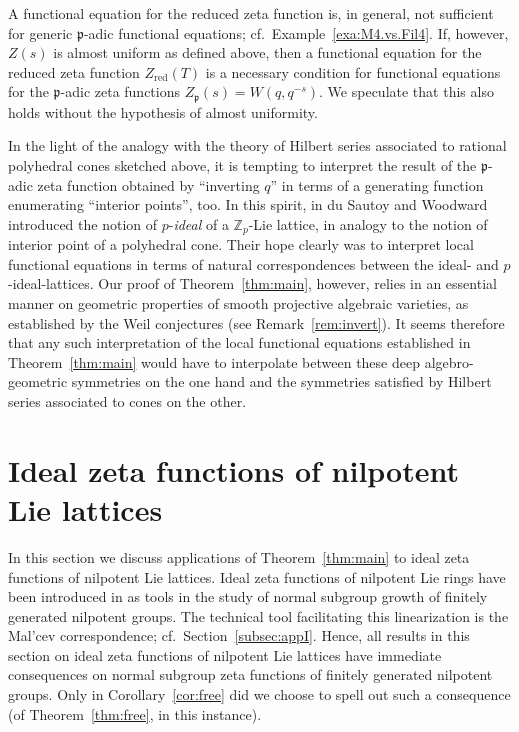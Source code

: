 \documentclass[11pt]{amsart}
\numberwithin{equation}{section}
\numberwithin{figure}{section}
\theoremstyle{plain}
\theoremstyle{definition}
\theoremstyle{remark}
\begin{document}
A functional equation for the reduced zeta function is, in general,
not sufficient for generic ${\mathfrak{p}}$-adic functional equations;
cf.\ Example~\ref{exa:M4.vs.Fil4}. If, however, $Z(s)$ is almost
uniform as defined above, then a functional equation for the reduced
zeta function $Z_\operatorname{red}(T)$ is a necessary condition for functional
equations for the ${\mathfrak{p}}$-adic zeta functions $Z_{\mathfrak{p}}(s) =
W(q,q^{-s})$. We speculate that this also holds without the hypothesis
of almost uniformity.

In the light of the analogy with the theory of Hilbert series
associated to rational polyhedral cones sketched above, it is tempting
to interpret the result of the ${\mathfrak{p}}$-adic zeta function obtained by
``inverting $q$'' in terms of a generating function enumerating
``interior points'', too. In this spirit, in
\cite[Definition~4.26]{duSWoodward/08} du Sautoy and Woodward
introduced the notion of $p$-\emph{ideal} of a ${\ensuremath{\mathbb{Z}_p}}$-Lie lattice, in
analogy to the notion of interior point of a polyhedral cone. Their
hope clearly was to interpret local functional equations in terms of
natural correspondences between the ideal- and $p$-ideal-lattices. Our
proof of Theorem~\ref{thm:main}, however, relies in an essential
manner on geometric properties of smooth projective algebraic
varieties, as established by the Weil conjectures (see
Remark~\ref{rem:invert}). It seems therefore that any such
interpretation of the local functional equations established in
Theorem~\ref{thm:main} would have to interpolate between these deep
algebro-geometric symmetries on the one hand and the symmetries
satisfied by Hilbert series associated to cones on the other.

\section{Ideal zeta functions of nilpotent Lie lattices}\label{sec:nil}

In this section we discuss applications of Theorem~\ref{thm:main} to
ideal zeta functions of nilpotent Lie lattices.  Ideal zeta functions
of nilpotent Lie rings have been introduced in \cite{GSS/88} as tools
in the study of normal subgroup growth of finitely generated nilpotent
groups. The technical tool facilitating this linearization is the
Mal'cev correspondence; cf.\ Section~\ref{subsec:appI}. Hence, all
results in this section on ideal zeta functions of nilpotent Lie
lattices have immediate consequences on normal subgroup zeta functions
of finitely generated nilpotent groups. Only in
Corollary~\ref{cor:free} did we choose to spell out such a consequence
(of Theorem~\ref{thm:free}, in this instance).
\end{document}
